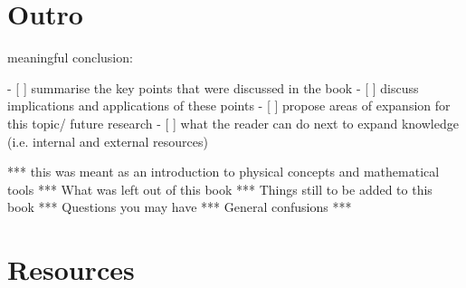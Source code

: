 \backmatter
\chapter{Outro}

meaningful conclusion:

- [ ] summarise the key points that were discussed in the book
- [ ] discuss implications and applications of these points
- [ ] propose areas of expansion for this topic/ future research
- [ ] what the reader can do next to expand knowledge (i.e. internal and external resources)

*** this was meant as an introduction to physical concepts and mathematical tools
*** What was left out of this book
*** Things still to be added to this book
*** Questions you may have
*** General confusions
***

\chapter{Resources}
